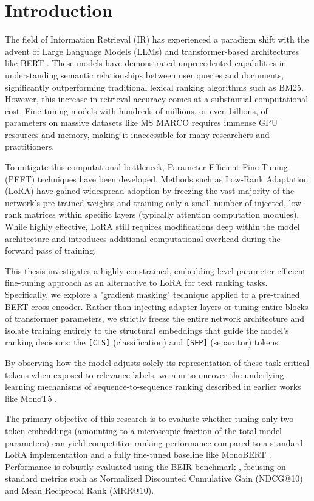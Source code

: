\chapter{Introduction}
\label{ch:introduction}

The field of Information Retrieval (IR) has experienced a paradigm shift with the advent of Large Language Models (LLMs) and transformer-based architectures like BERT \cite{devlin2018bert}. These models have demonstrated unprecedented capabilities in understanding semantic relationships between user queries and documents, significantly outperforming traditional lexical ranking algorithms such as BM25. However, this increase in retrieval accuracy comes at a substantial computational cost. Fine-tuning models with hundreds of millions, or even billions, of parameters on massive datasets like MS MARCO \cite{nogueira2020document} requires immense GPU resources and memory, making it inaccessible for many researchers and practitioners.

To mitigate this computational bottleneck, Parameter-Efficient Fine-Tuning (PEFT) techniques have been developed. Methods such as Low-Rank Adaptation (LoRA) \cite{hu2021lora} have gained widespread adoption by freezing the vast majority of the network's pre-trained weights and training only a small number of injected, low-rank matrices within specific layers (typically attention computation modules). While highly effective, LoRA still requires modifications deep within the model architecture and introduces additional computational overhead during the forward pass of training.

This thesis investigates a highly constrained, embedding-level parameter-efficient fine-tuning approach as an alternative to LoRA for text ranking tasks. Specifically, we explore a "gradient masking" technique applied to a pre-trained BERT cross-encoder. Rather than injecting adapter layers or tuning entire blocks of transformer parameters, we strictly freeze the entire network architecture and isolate training entirely to the structural embeddings that guide the model's ranking decisions: the \texttt{[CLS]} (classification) and \texttt{[SEP]} (separator) tokens. 

By observing how the model adjusts solely its representation of these task-critical tokens when exposed to relevance labels, we aim to uncover the underlying learning mechanisms of sequence-to-sequence ranking described in earlier works like MonoT5 \cite{nogueira2020document}.

The primary objective of this research is to evaluate whether tuning only two token embeddings (amounting to a microscopic fraction of the total model parameters) can yield competitive ranking performance compared to a standard LoRA implementation and a fully fine-tuned baseline like MonoBERT \cite{lin2021pretrained}. Performance is robustly evaluated using the BEIR benchmark \cite{thakur2021beir}, focusing on standard metrics such as Normalized Discounted Cumulative Gain (NDCG@10) and Mean Reciprocal Rank (MRR@10).

